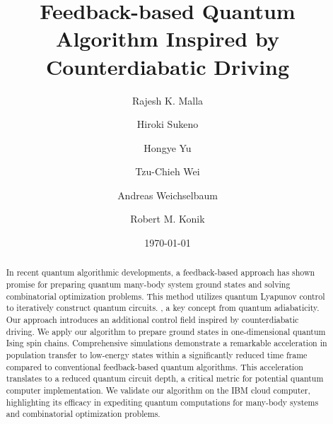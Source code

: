 \documentclass[twocolumn,aps,superscriptaddress,floatfix,longbibliography]{revtex4-2}
\begin{document}
	
	 \title{Feedback-based Quantum Algorithm Inspired by Counterdiabatic Driving}
	
\author{Rajesh K. Malla}

\author{Hiroki Sukeno}

\author{Hongye Yu}

\author{Tzu-Chieh Wei}

\author{Andreas Weichselbaum}

\author{Robert M. Konik}
	
\date{\today}
	
\begin{abstract}
In recent quantum algorithmic developments, a feedback-based approach has shown promise for preparing quantum many-body
system ground states and solving combinatorial optimization
problems. This method utilizes quantum Lyapunov control to
iteratively construct quantum circuits. , a key concept from
quantum adiabaticity. Our approach introduces an additional
control field inspired by counterdiabatic driving. We apply our
algorithm to prepare ground states in one-dimensional quantum
Ising spin chains. Comprehensive simulations demonstrate a
remarkable acceleration in population transfer to low-energy
states within a significantly reduced time frame compared to
conventional feedback-based quantum algorithms. This
acceleration translates to a reduced quantum circuit depth, a
critical metric for potential quantum computer implementation.
We validate our algorithm on the IBM cloud computer,
highlighting its efficacy in expediting quantum computations for
many-body systems and combinatorial optimization problems. 
\end{abstract}
\end{document}
